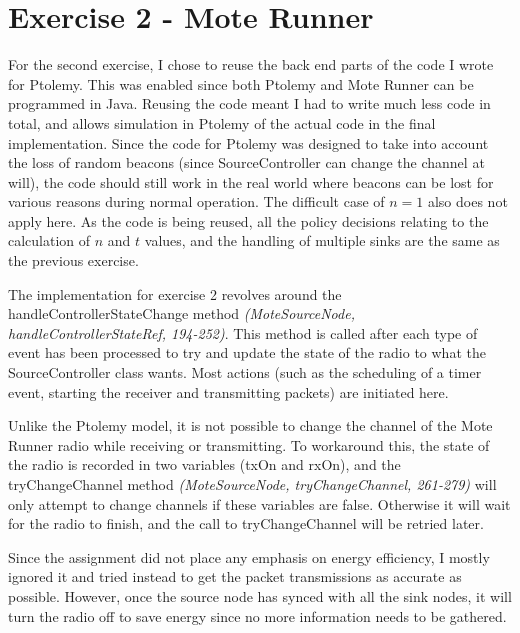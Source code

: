 \documentclass[a4paper,12pt,DIV=calc]{scrartcl}
\newcommand{\coderef}[3]{\emph{(#1, #2, #3)}}
\begin{document}
\section{Exercise 2 - Mote Runner}
For the second exercise, I chose to reuse the back end parts of the code I wrote
for Ptolemy. This was enabled since both Ptolemy and Mote Runner can be
programmed in Java. Reusing the code meant I had to write much less code in
total, and allows simulation in Ptolemy of the actual code in the final
implementation. Since the code for Ptolemy was designed to take into account the
loss of random beacons (since SourceController can change the channel at will),
the code should still work in the real world where beacons can be lost for
various reasons during normal operation. The difficult case of $n = 1$ also does
not apply here. As the code is being reused, all the policy decisions relating
to the calculation of $n$ and $t$ values, and the handling of multiple sinks are
the same as the previous exercise.

The implementation for exercise 2 revolves around the
handleControllerStateChange method
\coderef{MoteSourceNode}{handleControllerStateRef}{194-252}. This method is
called after each type of event has been processed to try and update the state
of the radio to what the SourceController class wants. Most actions (such as the
scheduling of a timer event, starting the receiver and transmitting packets) are
initiated here.

Unlike the Ptolemy model, it is not possible to change the channel of the Mote
Runner radio while receiving or transmitting. To workaround this, the state of
the radio is recorded in two variables (txOn and rxOn), and the tryChangeChannel
method \coderef{MoteSourceNode}{tryChangeChannel}{261-279} will only attempt to
change channels if these variables are false. Otherwise it will wait for the
radio to finish, and the call to tryChangeChannel will be retried later.

Since the assignment did not place any emphasis on energy efficiency, I mostly
ignored it and tried instead to get the packet transmissions as accurate as
possible. However, once the source node has synced with all the sink nodes, it
will turn the radio off to save energy since no more information needs to be
gathered.
\end{document}

